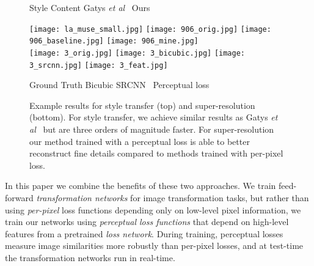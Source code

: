 \documentclass[runningheads]{llncs}
\newcommand{\etal}{\textit{et al}}
\begin{document}
\begin{figure}[t]
  \hspace{20mm} Style
  \hspace{15.5mm} Content
  \hspace{5.5mm} Gatys \etal~\cite{gatys2015neural}
  \hspace{6.5mm} Ours
  \vspace{-2.5mm}
  \begin{center}
    \texttt{[image: la\_muse\_small.jpg]}
    \texttt{[image: 906\_orig.jpg]}
    \texttt{[image: 906\_baseline.jpg]}
    \texttt{[image: 906\_mine.jpg]} \\
    \vspace{1mm}
    \texttt{[image: 3\_orig.jpg]}
    \texttt{[image: 3\_bicubic.jpg]}
    \texttt{[image: 3\_srcnn.jpg]}
    \texttt{[image: 3\_feat.jpg]}
  \end{center}
  \vspace{-3mm}
  \hspace{14mm} Ground Truth
  \hspace{7mm} Bicubic
  \hspace{8mm} SRCNN~\cite{dong2014learning}
  \hspace{2mm} Perceptual loss
  \vspace{-1mm}
  \caption{Example results for style transfer (top) and  super-resolution
    (bottom). For style transfer, we achieve similar results as Gatys \etal~\cite{gatys2015neural}
    but are three orders of magnitude faster. For super-resolution our method trained with a
    perceptual loss is able to better reconstruct fine details compared to methods trained with
    per-pixel loss.
  }
  \vspace{-5mm}
\end{figure}

In this paper we combine the benefits of these two approaches.
We train feed-forward \emph{transformation networks} for image transformation tasks,
but rather than using \emph{per-pixel} loss functions depending only on low-level pixel
information, we train our networks using \emph{perceptual loss functions} that depend
on high-level features from a pretrained \emph{loss network}. During training, perceptual
losses measure image similarities more robustly than per-pixel losses, and at test-time
the transformation networks run in real-time.
\end{document}
